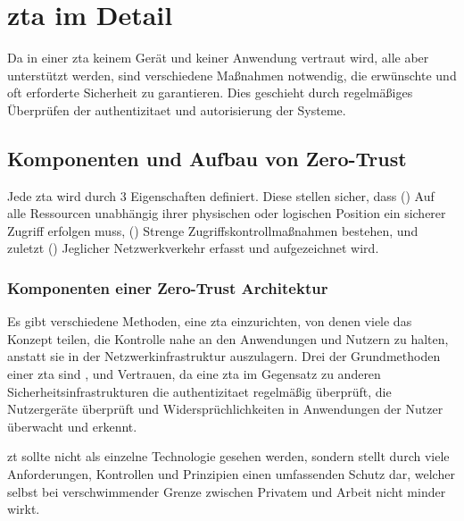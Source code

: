\newpage
\section[Zero-Trust Architektur im Detail]{\ac{zta} im Detail}\label{sec:zta-im-detail}
Da in einer \ac{zta} keinem Gerät und keiner Anwendung vertraut wird, alle aber unterstützt werden, sind verschiedene Maßnahmen notwendig, die erwünschte und oft erforderte Sicherheit zu garantieren.
Dies geschieht durch regelmäßiges Überprüfen der \gls{authentizitaet} und \gls{autorisierung} der Systeme.\autocite[\vglf][]{dsilvia-2021}

\subsection{Komponenten und Aufbau von Zero-Trust}\label{subsec:komponenten-und-aufbau-von-zero-trust}
Jede \ac{zta} wird durch $3$ Eigenschaften definiert.
Diese stellen sicher, dass () Auf alle Ressourcen unabhängig ihrer physischen oder logischen Position ein sicherer Zugriff erfolgen muss, () Strenge Zugriffskontrollmaßnahmen bestehen, und zuletzt () Jeglicher Netzwerkverkehr erfasst und aufgezeichnet wird.\autocite[\vglf][]{dsilvia-2021}

\subsubsection{Komponenten einer Zero-Trust Architektur}
Es gibt verschiedene Methoden, eine \ac{zta} einzurichten, von denen viele das Konzept teilen, die Kontrolle nahe an den Anwendungen und Nutzern zu halten, anstatt sie in der Netzwerkinfrastruktur auszulagern.\autocite[\vglf][]{buck-2021}
Drei der Grundmethoden einer \ac{zta} sind ,  und Vertrauen, da eine \ac{zta} im Gegensatz zu anderen Sicherheitsinfrastrukturen die \gls{authentizitaet} regelmäßig überprüft, die Nutzergeräte überprüft und Widersprüchlichkeiten in Anwendungen der Nutzer überwacht und erkennt.\autocite[\vglf][]{dsilvia-2021}

\ac{zt} sollte nicht als einzelne Technologie gesehen werden, sondern stellt durch viele Anforderungen, Kontrollen und Prinzipien einen umfassenden Schutz dar, welcher selbst bei verschwimmender Grenze zwischen Privatem und Arbeit nicht minder wirkt.\autocite[\vglf][Was sind die Komponenten von Zero Trust]{akamai:online}

